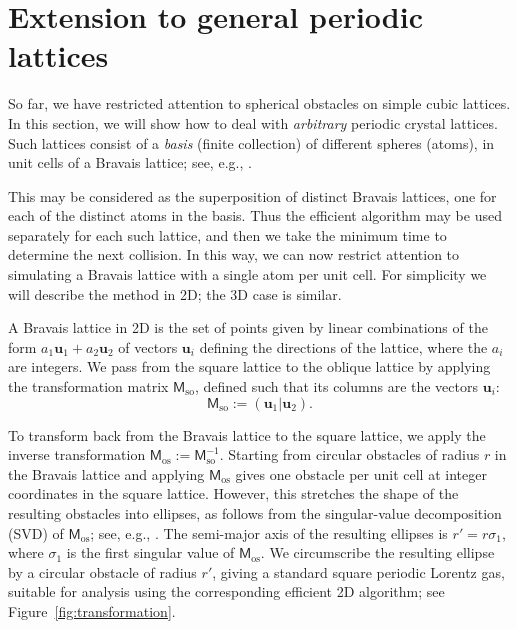 \documentclass[pre,amsmath,amssymb, twocolumn, showpacs]{revtex4-1}
\renewcommand{\vec}[1]{\mathbf{#1}}
\begin{document}
\section{Extension to general periodic lattices}

So far, we have restricted attention to spherical obstacles on simple cubic lattices. In this section, we will show how to deal with \emph{arbitrary} periodic crystal lattices. Such lattices consist of a \emph{basis} (finite collection) of different spheres (atoms), in unit cells of a Bravais lattice; see, e.g., \cite{AshcroftMermin}. 

This may be considered as the superposition of distinct Bravais lattices, one for each of the distinct atoms in the basis. Thus the efficient algorithm may be used separately for each such lattice, and then we take the minimum time to determine the next collision. In this way, we can now restrict attention to simulating a  Bravais lattice with a single atom per unit cell. For simplicity we will describe the method in 2D; the 3D case is similar.

A Bravais lattice in 2D is the set of points given by linear combinations of the form $a_{1} \vec{u}_{1} + a_{2} \vec{u}_{2}$ of vectors $\vec{u}_{i}$  defining the directions of the lattice, where the $a_{i}$ are integers. We pass from the square lattice to the oblique lattice by applying the transformation matrix 
$\mathsf{M}_\mathrm{so}$, defined such that its columns are the vectors $\vec{u}_{i}$:
\begin{equation}
\mathsf{M}_\mathrm{so} := (\vec{u}_1 | \vec{u}_2).
\end{equation}

To transform back from the Bravais lattice to the square lattice, we apply the inverse transformation 
$\mathsf{M}_\mathrm{os} := \mathsf{M}_\mathrm{so}^{-1}$.
Starting from circular obstacles of radius $r$ in the Bravais lattice and applying $\mathsf{M}_\mathrm{os}$ gives one obstacle per unit cell at integer coordinates in the square lattice. However, this stretches the shape of the resulting obstacles into ellipses, as follows from the singular-value decomposition (SVD) of $\mathsf{M}_\mathrm{os}$; see, e.g., \cite{TrefethenBau}. 
The semi-major axis of the resulting ellipses is $r' = r \sigma_1$, where $\sigma_1$ is the first singular value of $\mathsf{M}_\mathrm{os}$. 
We circumscribe the resulting ellipse by a circular obstacle of radius $r'$, giving a standard square periodic Lorentz gas, suitable for analysis using the corresponding efficient 2D algorithm; see Figure~\ref{fig:transformation}.
\end{document}
